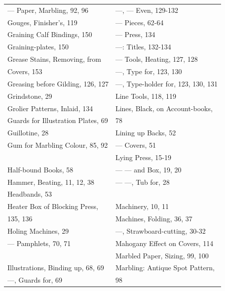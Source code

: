\documentclass[twoside]{book}
\begin{document}
\begin{center}
\begin{tiny}
\begin{tabular}{l|l}
--- Paper, Marbling, 92, 96        & ---, --- Even, 129-132             \\
Gouges, Finisher's, 119            & --- Pieces, 62-64                  \\
Graining Calf Bindings, 150        & --- Press, 134                     \\
Graining-plates, 150               & ---: Titles, 132-134               \\
Grease Stains, Removing, from      & --- Tools, Heating, 127, 128       \\
    Covers, 153                    & ---, Type for, 123, 130            \\
Greasing before Gilding, 126, 127  & ---, Type-holder for, 123, 130, 131\\
Grindstone, 29                     & Line Tools, 118, 119               \\
Grolier Patterns, Inlaid, 134      & Lines, Black, on Account-books,    \\
Guards for Illustration Plates, 69 &     78                             \\
Guillotine, 28                     & Lining up Backs, 52                \\
Gum for Marbling Colour, 85, 92    & --- Covers, 51                     \\
                                   & Lying Press, 15-19                 \\
Half-bound Books, 58               & --- --- and Box, 19, 20            \\
Hammer, Beating, 11, 12, 38        & --- ---, Tub for, 28               \\
Headbands, 53                      &                                    \\
Heater Box of Blocking Press,      & Machinery, 10, 11                  \\
    135, 136                       & Machines, Folding, 36, 37          \\
Holing Machines, 29                & ---, Strawboard-cutting, 30-32     \\
--- Pamphlets, 70, 71              & Mahogany Effect on Covers, 114     \\
                                   & Marbled Paper, Sizing, 99, 100     \\
Illustrations, Binding up, 68, 69  & Marbling: Antique Spot Pattern,    \\
---, Guards for, 69                &     98                             \\

\end{tabular}
\end{tiny}
\end{center}
\end{document}
